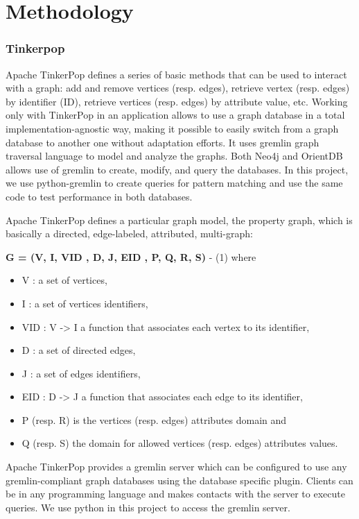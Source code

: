 \section{Methodology}

\subsubsection{Tinkerpop}

Apache TinkerPop defines a series of basic methods that can be used to interact with a graph: add and remove vertices (resp. edges), retrieve vertex (resp. edges) by identifier (ID), retrieve vertices (resp. edges) by attribute value, etc. Working only with TinkerPop in an application allows to use a graph database in a total implementation-agnostic way, making it possible to easily switch from a graph database to another one without adaptation efforts. It uses gremlin graph traversal language to model and analyze the graphs. Both Neo4j and OrientDB allows use of gremlin to create, modify, and query the databases. In this project, we use python-gremlin to create queries for pattern matching and use the same code to test performance in both databases. 

Apache TinkerPop defines a particular graph model, the property graph, which is basically a directed, edge-labeled, attributed, multi-graph:

\textbf{G = (V, I, VID , D, J, EID , P, Q, R, S)} - (1)
where 
\begin{itemize}
\item V : a set of vertices, 
\item I : a set of vertices identifiers, 
\item VID : V -> I a function that associates each vertex to its identifier, 
\item D : a set of directed edges, 
\item J : a set of edges identifiers, 
\item EID : D -> J a function that associates each edge to its identifier, 
\item P (resp. R) is the vertices (resp. edges) attributes domain and 
\item Q (resp. S) the domain for allowed vertices (resp. edges) attributes values.
\end{itemize}


Apache TinkerPop provides a gremlin server which can be configured to use any gremlin-compliant graph databases using the database specific plugin. Clients can be in any programming language and makes contacts with the server to execute queries. We use python in this project to access the gremlin server.

